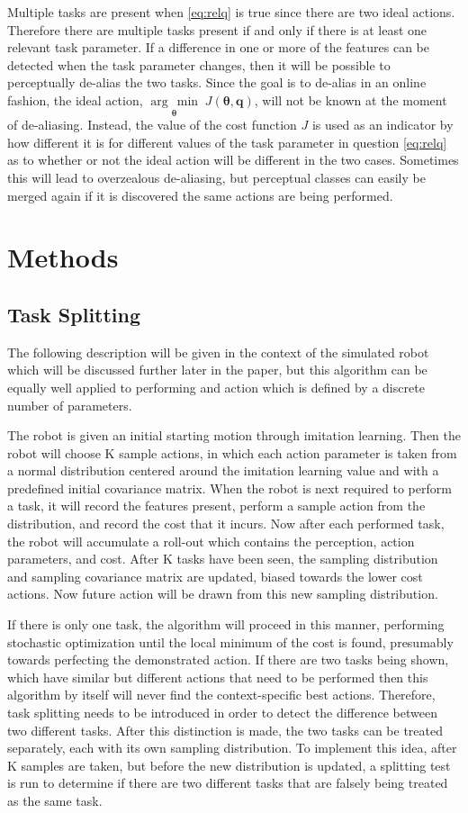 \documentclass[12pt]{article}
\newcommand{\taskp}  {\ensuremath{\mathbf{q}}}
\newcommand{\costf}  {\ensuremath{J}}
\newcommand{\app}    {\ensuremath{\bm{\theta}}}
\newcommand{\argmin}[1]{\underset{#1}{\operatorname{arg}\,\operatorname{min}}\;}
\begin{document}
Multiple tasks are present when \eqref{eq:relq} is true since there are two ideal actions. Therefore there are multiple tasks present if and only if there is at least one relevant task parameter. If a difference in one or more of the features can be detected when the task parameter changes, then it will be possible to perceptually de-alias the two tasks. Since the goal is to de-alias in an online fashion, the ideal action, $\argmin{\app}\costf(\app,\taskp)$, will not be known at the moment of de-aliasing. Instead, the value of the cost function $\costf$ is used as an indicator by how different it is for different values of the task parameter in question \eqref{eq:relq} as to whether or not the ideal action will be different in the two cases. Sometimes this will lead to overzealous de-aliasing, but perceptual classes can easily be merged again if it is discovered the same actions are being performed.

\section{Methods}

\subsection{Task Splitting}
The following description will be given in the context of the simulated robot which will be discussed further later in the paper, but this algorithm can be equally well applied to performing and action which is defined by a discrete number of parameters. 

The robot is given an initial starting motion through imitation learning. Then the robot will choose K sample actions, in which each action parameter is taken from a normal distribution centered around the imitation learning value and with a predefined initial covariance matrix. When the robot is next required to perform a task, it will record the features present, perform a sample action from the distribution, and record the cost that it incurs. Now after each performed task, the robot will accumulate a roll-out which contains the perception, action parameters, and cost. After K tasks have been seen, the sampling distribution and sampling covariance matrix are updated, biased towards the lower cost actions. Now future action will be drawn from this new sampling distribution. 

If there is only one task, the algorithm will proceed in this manner, performing stochastic optimization until the local minimum of the cost is found, presumably towards perfecting the demonstrated action. If there are two tasks being shown, which have similar but different actions that need to be performed then this algorithm by itself will never find the context-specific best actions. Therefore, task splitting needs to be introduced in order to detect the difference between two different tasks. After this distinction is made, the two tasks can be treated separately, each with its own sampling distribution. To implement this idea, after K samples are taken, but before the new distribution is updated, a splitting test is run to determine if there are two different tasks that are falsely being treated as the same task.
\end{document}
